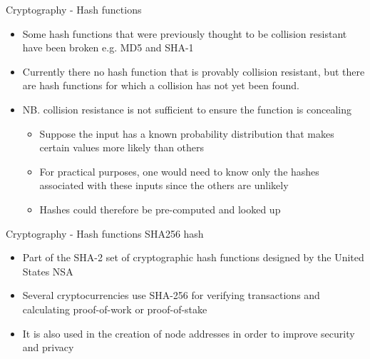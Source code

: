 \documentclass[9pt]{beamer}
\begin{document}

\begin{frame}{Cryptography - Hash functions}
	\begin{itemize}
		\item Some hash functions that were previously thought to be collision resistant have been broken e.g. MD5 and SHA-1
		\item Currently there no hash function that is provably collision resistant, but there are hash functions for which a collision has not yet been found.
		\item NB. collision resistance is not sufficient to ensure the function is concealing
		\begin{itemize}
			\item Suppose the input has a known probability distribution that makes certain values more likely than others
			\item For practical purposes, one would need to know only the hashes associated with these inputs since the others are unlikely
			\item Hashes could therefore be pre-computed and looked up
		\end{itemize}
	\end{itemize}
\end{frame}

\begin{frame}{Cryptography - Hash functions}
	SHA256 hash
	\begin{itemize}
		\item Part of the SHA-2 set of cryptographic hash functions designed by the United States NSA
		\item Several cryptocurrencies use SHA-256 for verifying transactions and calculating proof-of-work or proof-of-stake
		\item It is also used in the creation of node addresses in order to improve security and privacy
	\end{itemize}
\end{frame}

\end{document}
